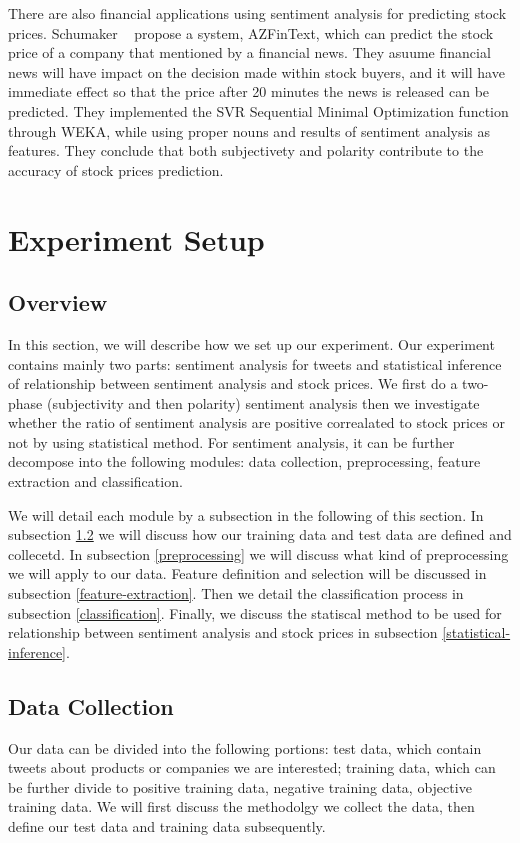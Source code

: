 \documentclass[12pt]{article}
\begin{document}
There are also financial applications using sentiment analysis for predicting stock prices. Schumaker \etal~\cite{Schumaker:2009} propose a system, AZFinText, which can predict the stock price of a company that mentioned by a financial news. They asuume financial news will have impact on the decision made within stock buyers, and it will have immediate effect so that the price after 20 minutes the news is released can be predicted. They implemented the SVR Sequential Minimal Optimization function through WEKA, while using proper nouns and results of sentiment analysis as features. They conclude that both subjectivety and polarity contribute to the accuracy of stock prices prediction.

\section{Experiment Setup}
\subsection{Overview}
In this section, we will describe how we set up our experiment. Our experiment contains mainly two parts: sentiment analysis for tweets and statistical inference of relationship between sentiment analysis and stock prices. We first do a two-phase (subjectivity and then polarity) sentiment analysis then we investigate whether the ratio of sentiment analysis are positive correalated to stock prices or not by using statistical method. For sentiment analysis, it can be further decompose into the following modules: data collection, preprocessing, feature extraction and classification. 

We will detail each module by a subsection in the following of this section. In subsection \ref{data-collection} we will discuss how our training data and test data are defined and collecetd. In subsection \ref{preprocessing} we will discuss what kind of preprocessing we will apply to our data. Feature definition and selection will be discussed in subsection \ref{feature-extraction}. Then we detail the classification process in subsection \ref{classification}. Finally, we discuss the statiscal method to be used for relationship between sentiment analysis and stock prices in subsection \ref{statistical-inference}.

\subsection{Data Collection}\label{data-collection}
Our data can be divided into the following portions: test data, which contain tweets about products or companies we are interested; training data, which can be further divide to positive training data, negative training data, objective training data. We will first discuss the methodolgy we collect the data, then define our test data and training data subsequently.
\end{document}
